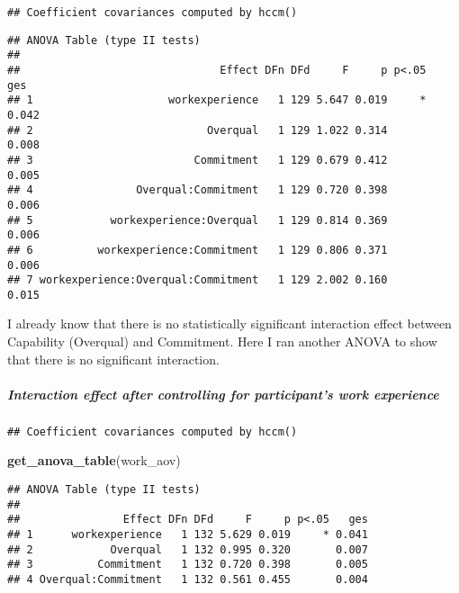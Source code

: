 \documentclass[]{article}
\newenvironment{Shaded}{\begin{snugshade}}{\end{snugshade}}
\newcommand{\KeywordTok}[1]{\textcolor[rgb]{0.13,0.29,0.53}{\textbf{#1}}}
\newcommand{\NormalTok}[1]{#1}
\newcommand{\OperatorTok}[1]{\textcolor[rgb]{0.81,0.36,0.00}{\textbf{#1}}}
\newcommand{\StringTok}[1]{\textcolor[rgb]{0.31,0.60,0.02}{#1}}
\let\oldsubparagraph\subparagraph
\renewcommand{\subparagraph}[1]{\oldsubparagraph{#1}\mbox{}}
\begin{document}
\begin{verbatim}
## Coefficient covariances computed by hccm()
\end{verbatim}

\begin{verbatim}
## ANOVA Table (type II tests)
## 
##                               Effect DFn DFd     F     p p<.05   ges
## 1                     workexperience   1 129 5.647 0.019     * 0.042
## 2                           Overqual   1 129 1.022 0.314       0.008
## 3                         Commitment   1 129 0.679 0.412       0.005
## 4                Overqual:Commitment   1 129 0.720 0.398       0.006
## 5            workexperience:Overqual   1 129 0.814 0.369       0.006
## 6          workexperience:Commitment   1 129 0.806 0.371       0.006
## 7 workexperience:Overqual:Commitment   1 129 2.002 0.160       0.015
\end{verbatim}

I already know that there is no statistically significant interaction
effect between Capability (Overqual) and Commitment. Here I ran another
ANOVA to show that there is no significant interaction.

\hypertarget{interaction-effect-after-controlling-for-participants-work-experience}{%
\subparagraph{Interaction effect after controlling for participant's
work
experience}\label{interaction-effect-after-controlling-for-participants-work-experience}}

\begin{Shaded}
\end{Shaded}

\begin{verbatim}
## Coefficient covariances computed by hccm()
\end{verbatim}

\begin{Shaded}
\begin{Highlighting}[]
\KeywordTok{get_anova_table}\NormalTok{(work_aov)}
\end{Highlighting}
\end{Shaded}

\begin{verbatim}
## ANOVA Table (type II tests)
## 
##                Effect DFn DFd     F     p p<.05   ges
## 1      workexperience   1 132 5.629 0.019     * 0.041
## 2            Overqual   1 132 0.995 0.320       0.007
## 3          Commitment   1 132 0.720 0.398       0.005
## 4 Overqual:Commitment   1 132 0.561 0.455       0.004
\end{verbatim}
\end{document}
